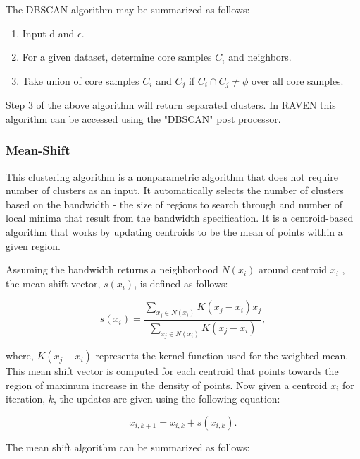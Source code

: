 \documentclass[11pt]{article}
\begin{document}
The DBSCAN algorithm may be summarized as follows:

\begin{enumerate}

\item Input d and $\epsilon$.

\item For a given dataset, determine core samples $C_i$ and neighbors.  

\item Take union of core samples $C_i$ and $C_j$ if $C_i \cap C_j \neq \phi$ over all core samples. 


\end{enumerate}

Step 3 of the above algorithm will return separated clusters. In RAVEN this algorithm can be accessed using the "DBSCAN" post processor. 

\subsubsection{Mean-Shift} 

This clustering algorithm is a nonparametric algorithm that does not require number of clusters as an input. It automatically selects the number of clusters based on the bandwidth - the size of regions to search through and number of local minima that result from the bandwidth specification. It is a centroid-based algorithm that works by updating centroids to be the mean of points within a given region.  

Assuming the bandwidth returns a neighborhood $N(x_i)$ around centroid $x_i$ , the mean shift vector, $s(x_i)$, is defined as follows:

\begin{equation}
\label{ms_vec}
s(x_i) = \frac{\sum_{x_j \in N(x_i)} K(x_j - x_i) x_j}{\sum_{x_j \in N(x_i)} K(x_j - x_i) },
\end{equation}

where, $K(x_j - x_i)$ represents the kernel function used for the weighted mean. This mean shift vector is computed for each centroid that points towards the region of maximum increase in the density of points. Now given a centroid $x_i$ for iteration, $k$, the updates are given using the following equation: 

\begin{equation}
x_{i, k+1} = x_{i, k} + s(x_{i, k}).
\end{equation}

The mean shift algorithm can be summarized as follows:
\end{document}
